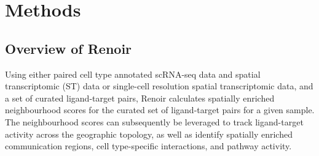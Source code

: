 \section*{Methods}
\label{section: main paper data processing}
\doublespacing

\subsection*{Overview of Renoir}
Using either paired cell type annotated scRNA-seq data and spatial transcriptomic (ST) data or single-cell resolution spatial transcriptomic data, and a set of curated ligand-target pairs, Renoir calculates spatially enriched neighbourhood scores for the curated set of ligand-target pairs for a given sample. The neighbourhood scores can subsequently be leveraged to track ligand-target activity across the geographic topology, as well as identify spatially enriched communication regions, cell type-specific interactions, and pathway activity.

